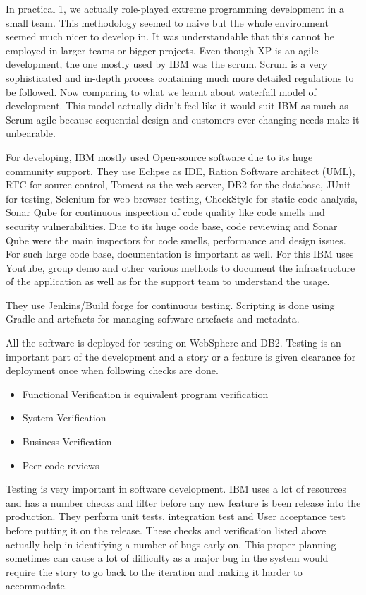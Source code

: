 In practical 1, we actually role-played extreme programming development in a small team. This methodology seemed to naive but the whole environment seemed much nicer to develop in. It was understandable that this cannot be employed in larger teams or bigger projects. Even though XP is an agile development, the one mostly used by IBM was the scrum. Scrum is a very sophisticated and in-depth process containing much more detailed regulations to be followed. Now comparing to what we learnt about waterfall model of development. This model actually didn't feel like it would suit IBM as much as Scrum agile because sequential design and customers ever-changing needs make it unbearable.

For developing, IBM mostly used Open-source software due to its huge community support. They use Eclipse as IDE, Ration Software architect (UML), RTC for source control, Tomcat as the web server, DB2 for the database, JUnit for testing, Selenium for web browser testing, CheckStyle for static code analysis, Sonar Qube for continuous inspection of code quality like code smells and security vulnerabilities. Due to its huge code base, code reviewing and Sonar Qube were the main inspectors for code smells, performance and design issues. For such large code base, documentation is important as well. For this IBM uses Youtube, group demo and other various methods to document the infrastructure of the application as well as for the support team to understand the usage.

They use Jenkins/Build forge for continuous testing. Scripting is done using Gradle and artefacts for managing software artefacts and metadata.

All the software is deployed for testing on WebSphere and DB2. Testing is an important part of the development and a story or a feature is given clearance for deployment once when following checks are done.

\begin{itemize}
    \item Functional Verification is equivalent program verification
    \item System Verification
    \item Business Verification
    \item Peer code reviews
\end{itemize}

Testing is very important in software development. IBM uses a lot of resources and has a number checks and filter before any new feature is been release into the production. They perform unit tests, integration test and User acceptance test before putting it on the release. These checks and verification listed above actually help in identifying a number of bugs early on. This proper planning sometimes can cause a lot of difficulty as a major bug in the system would require the story to go back to the iteration and making it harder to accommodate. 


